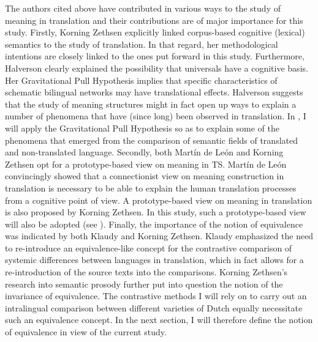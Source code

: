 The authors cited above have contributed in various ways to the study of meaning in translation and their contributions are of major importance for this study. Firstly, Korning Zethsen explicitly linked corpus-based cognitive (lexical) semantics to the study of translation. In that regard, her methodological intentions are closely linked to the ones put forward in this study. Furthermore, Halverson clearly explained the possibility that universals have a cognitive basis. Her Gravitational Pull Hypothesis implies that specific characteristics of schematic bilingual networks may have translational effects. Halverson suggests that the study of meaning structures might in fact open up ways to explain a number of phenomena that have (since long) been observed in translation. In , I will apply the Gravitational Pull Hypothesis so as to explain some of the phenomena that emerged from the comparison of semantic fields of translated and non-translated language. Secondly, both Martín de León and Korning Zethsen opt for a prototype-based view on meaning in TS. Martín de León convincingly showed that a connectionist view on meaning construction in translation is necessary to be able to explain the human translation processes from a cognitive point of view. A prototype-based view on meaning in translation is also proposed by Korning Zethsen. In this study, such a prototype-based view will also be adopted (see ). Finally, the importance of the notion of equivalence was indicated by both Klaudy and Korning Zethsen. Klaudy emphasized the need to re-introduce an equivalence-like concept for the contrastive comparison of systemic differences between languages in translation, which in fact allows for a re-introduction of the source texts into the comparisons. Korning Zethsen’s research into semantic prosody further put into question the notion of the invariance of equivalence. The contrastive methods I will rely on to carry out an intralingual comparison between different varieties of Dutch equally necessitate such an equivalence concept. In the next section, I will therefore define the notion of equivalence in view of the current study.

